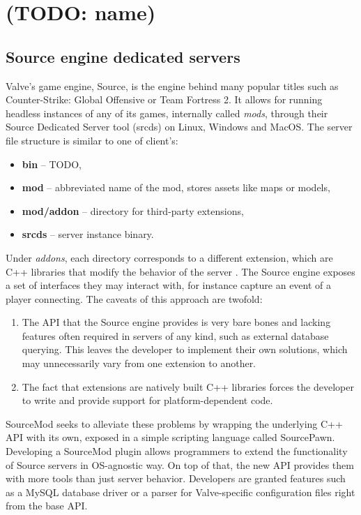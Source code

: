 \chapter{(TODO: name)}
\section{Source engine dedicated servers}

Valve's game engine, Source, is the engine behind many popular titles such as Counter-Strike: Global Offensive or Team Fortress 2.
It allows for running headless instances of any of its games, internally called \textit{mods}, through their Source Dedicated Server tool (srcds) on Linux, Windows and MacOS.
The server file structure is similar to one of client's:
\begin{itemize}
    \item \textbf{bin} -- TODO,
    \item \textbf{mod} -- abbreviated name of the mod, stores assets like maps or models,
    \item \textbf{mod/addon} -- directory for third-party extensions,
    \item \textbf{srcds} -- server instance binary.
\end{itemize}
Under \textit{addons}, each directory corresponds to a different extension, which are C++ libraries that modify the behavior of the server \cite{server-plugins}.
The Source engine exposes a set of interfaces they may interact with, for instance capture an event of a player connecting.
The caveats of this approach are twofold:
\begin{enumerate}
\item
The API that the Source engine provides is very bare bones and lacking features often required in servers of any kind, such as external database querying.
This leaves the developer to implement their own solutions, which may unnecessarily vary from one extension to another.
\item
The fact that extensions are natively built C++ libraries forces the developer to write and provide support for platform-dependent code.
\end{enumerate}
SourceMod seeks to alleviate these problems by wrapping the underlying C++ API with its own, exposed in a simple scripting language called SourcePawn.
Developing a SourceMod plugin allows programmers to extend the functionality of Source servers in OS-agnostic way.
On top of that, the new API provides them with more tools than just server behavior.
Developers are granted features such as a MySQL database driver or a parser for Valve-specific configuration files right from the base API.

